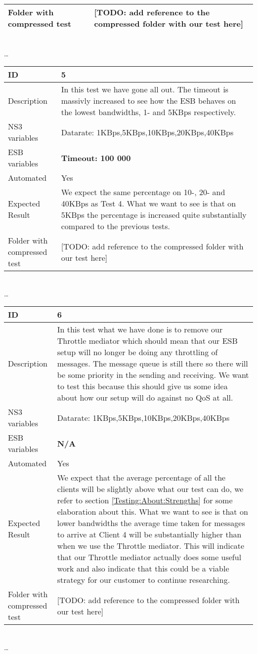 \begin{center}
\begin{tabular}{| p{4cm} | p{8cm} |}
\hline
Folder with compressed test & [TODO: add reference to the compressed folder with our test here]\\
\hline
\end{tabular}
\\ \ldots \\
\begin{tabular}{| p{4cm} | p{8cm} |}%
\hline
ID & 5 \\
\hline
Description & In this test we have gone all out. The timeout is massivly increased to see how the ESB behaves on the lowest bandwidths, 1- and 5KBps respectively.  \\
\hline
NS3 variables & Datarate: 1KBps,5KBps,10KBps,20KBps,40KBps \\
\hline
ESB variables & \textbf{Timeout: 100 000} \\
\hline
Automated & Yes \\
\hline
Expected Result & We expect the same percentage on 10-, 20- and 40KBps as Test 4. What we want to see is that on 5KBps the percentage is increased quite substantially compared to the previous tests. \\
\hline
Folder with compressed test & [TODO: add reference to the compressed folder with our test here]\\
\hline
\end{tabular}
\\ \ldots \\
\begin{tabular}{| p{4cm} | p{8cm} |}%
\hline
ID & 6 \\
\hline
Description & In this test what we have done is to remove our Throttle mediator which should mean that our ESB setup will no longer be doing any throttling of messages. The message queue is still there so there will be some priority in the sending and receiving. We want to test this because this should give us some idea about how our setup will do against no QoS at all. \\
\hline
NS3 variables & Datarate: 1KBps,5KBps,10KBps,20KBps,40KBps \\
\hline
ESB variables & \textbf{N/A} \\
\hline
Automated & Yes \\
\hline
Expected Result & We expect that the average percentage of all the clients will be slightly above what our test can do, we refer to section \ref{Testing:About:Strengths} for some elaboration about this. What we want to see is that on lower bandwidths the average time taken for messages to arrive at Client 4 will be substantially higher than when we use the Throttle mediator. This will indicate that our Throttle mediator actually does some useful work and also indicate that this could be a viable strategy for our customer to continue researching. \\
\hline
Folder with compressed test & [TODO: add reference to the compressed folder with our test here]\\
\hline
\end{tabular}
\\ \ldots \\
\end{center}
